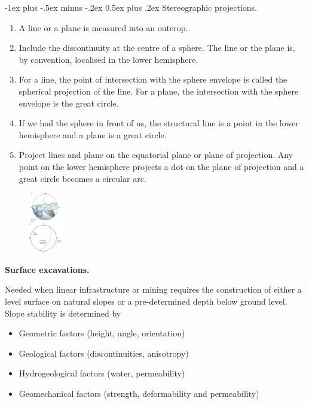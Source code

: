 \documentclass[10pt,landscape,a4paper]{article}
\makeatletter
\newcounter{Chapcounter}
\newcommand{\chapter}[1]{{\addtocounter{Chapcounter}{1}\fontsize{17}{16}\textbf{#1}}}
\renewcommand{\section}{\@startsection{section}{1}{0mm}%
	{-1ex plus -.5ex minus -.2ex}%
	{0.5ex plus .2ex}%
	{\normalfont\large\bfseries}}
\makeatother
\begin{document}
\begin{multicols}{3}
	\section{Stereographic projections.}
	\begin{enumerate}
		\item A line or a plane is measured into an outcrop.
		\item Include the discontinuity at the centre of a sphere. The line or the plane is, by convention, localised in the lower hemisphere.
		\item For a line, the point of intersection with the sphere envelope is called the spherical projection of the line. For a plane, the intersection with the sphere envelope is the great circle.
		\item If we had the sphere in front of us, the structural line is a point in the lower hemisphere and a plane is a great circle.
		\item Project lines and plane on the equatorial plane or plane of projection. Any point on the lower hemisphere projects a dot on the plane of projection and a great circle becomes a circular arc.
	\end{enumerate}
	\begin{figure}[H]
		\centering
		\includegraphics[width=0.13\textwidth]{stereographic}
	\end{figure}
	
	\chapter{Surface excavations.}
	
	Needed when linear infrastructure or mining requires the construction of either a level surface on natural slopes or a pre-determined depth below ground level.
	Slope stability is determined by
	\begin{itemize}
		\item Geometric factors (height, angle, orientation)
		\item Geological factors (discontinuities, anisotropy)
		\item Hydrogeological factors (water, permeability)
		\item Geomechanical factors (strength, deformability and permeability)
	\end{itemize}
	

\end{multicols}
\end{document}
